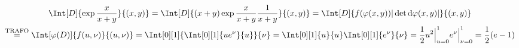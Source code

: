 \begin{solution}
\begin{multline*}
    \Int[D]
    {
        \exp \frac{x}{x + y}
    }{(x, y)}
    =
    \Int[D]
    {
        (x + y)
        \exp \frac{x}{x + y}
        \frac{1}{x + y}
    }{(x, y)}
    =
    \Int[D]
    {
        f(\varphi(x, y))
        |\det \mathrm{d} \varphi(x, y)|
    }{(x, y)} \\
    \stackrel
    {
        \text{TRAFO}
    }{=}
    \Int[\varphi(D)]
    {
        f(u, \nu)
    }{(u, \nu)}
    =
    \Int[0][1]
    {
        \Int[0][1]
        {
            u e^\nu
        }{u}
    }{\nu}
    =
    \Int[0][1]{u}{u}
    \Int[0][1]{e^\nu}{\nu}
    =
    \frac{1}{2}
    u^2 \Big |_{u=0}^1
    e^\nu \Big |_{\nu = 0}^1
    =
    \frac{1}{2}
    (e - 1)
\end{multline*}

\end{solution}

